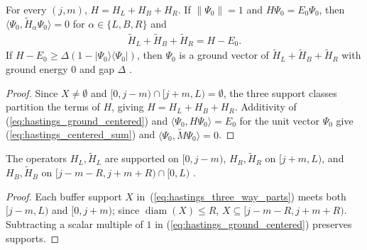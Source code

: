 \begin{lemma}
    \label{thm:hastings_three_way_splitting_sum}
    \leanok
    For every $(j,m)$, $H=H_L+H_B+H_R$. If $\|\Psi_0\|=1$ and
    $H\Psi_0=E_0\Psi_0$, then $\langle\Psi_0,\widetilde H_\alpha\Psi_0\rangle=0$
    for $\alpha\in\{L,B,R\}$ and
    \begin{align}
        \widetilde H_L+\widetilde H_B+\widetilde H_R=H-E_0.
        \label{eq:hastings_centered_sum}
    \end{align}
    If $H-E_0\ge\Delta(1-|\Psi_0\rangle\langle\Psi_0|)$, then $\Psi_0$ is a
    ground vector of $\widetilde H_L+\widetilde H_B+\widetilde H_R$ with ground
    energy $0$ and gap $\Delta$ \cite[lines 766--782]{Hastings2007AreaLaw}.
\end{lemma}
\begin{proof}\leanok
    Since $X\ne\emptyset$ and $\lbrack0,j-m)\cap\lbrack j+m,L)=\emptyset$, the three support
    classes partition the terms of $H$, giving $H=H_L+H_B+H_R$. Additivity of
    (\ref{eq:hastings_ground_centered}) and
    $\langle\Psi_0,H\Psi_0\rangle=E_0$ for the unit vector $\Psi_0$ give
    (\ref{eq:hastings_centered_sum}) and
    $\langle\Psi_0,\widetilde M\Psi_0\rangle=0$.
\end{proof}

\begin{lemma}
    \label{thm:hastings_three_way_splitting_supports}
    \leanok
    The operators $H_L,\widetilde H_L$ are supported on $\lbrack0,j-m)$,
    $H_R,\widetilde H_R$ on $\lbrack j+m,L)$, and $H_B,\widetilde H_B$ on
    $\lbrack j-m-R,j+m+R)\cap\lbrack0,L)$ \cite[lines 774--778]{Hastings2007AreaLaw}.
\end{lemma}
\begin{proof}\leanok
    Each buffer support $X$ in~(\ref{eq:hastings_three_way_parts}) meets both
    $\lbrack j-m,L)$ and $\lbrack0,j+m)$; since $\operatorname{diam}(X)\le R$,
    $X\subseteq\lbrack j-m-R,j+m+R)$. Subtracting a scalar multiple of $1$ in
    (\ref{eq:hastings_ground_centered}) preserves supports.
\end{proof}

